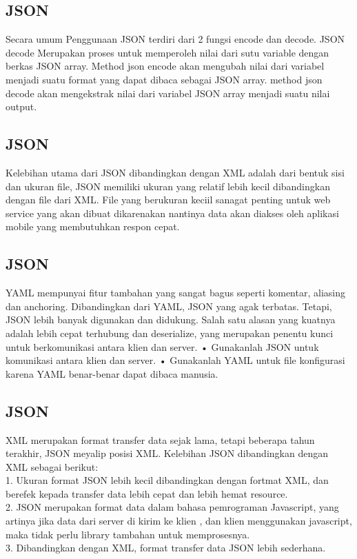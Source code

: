 \documentclass[a4paper]{article}
\begin{document}
\subsection{JSON}
Secara umum Penggunaan JSON terdiri dari 2 fungsi encode dan decode.  JSON decode Merupakan proses untuk  memperoleh nilai dari sutu variable dengan berkas JSON array. Method json encode akan mengubah nilai dari variabel  menjadi suatu format yang dapat dibaca sebagai JSON array. method json decode  akan mengekstrak nilai dari variabel JSON array  menjadi suatu nilai output.
\subsection{JSON}
Kelebihan utama dari JSON dibandingkan dengan XML adalah dari bentuk sisi dan ukuran file, JSON memiliki ukuran yang relatif  lebih kecil dibandingkan dengan file dari XML. File yang berukuran keciil sanagat penting untuk web service yang akan dibuat dikarenakan nantinya data akan diakses oleh aplikasi mobile yang membutuhkan respon cepat.
\subsection{JSON}
YAML mempunyai fitur tambahan yang sangat bagus seperti komentar, aliasing dan anchoring.  Dibandingkan dari YAML, JSON yang agak terbatas. Tetapi, JSON lebih banyak digunakan dan didukung. Salah satu alasan yang kuatnya adalah lebih cepat terhubung dan deserialize, yang merupakan penentu kunci untuk berkomunikasi antara klien dan server.
•	Gunakanlah JSON untuk komunikasi antara klien dan server.
•	Gunakanlah YAML untuk file konfigurasi karena YAML benar-benar dapat dibaca manusia.
\subsection{JSON}
XML merupakan format transfer data sejak lama, tetapi beberapa tahun terakhir, JSON meyalip posisi XML. Kelebihan JSON dibandingkan dengan XML sebagai berikut:\\
1.	Ukuran format JSON lebih kecil dibandingkan dengan fortmat XML, dan berefek kepada transfer data lebih cepat dan lebih hemat resource.\\
2.	JSON merupakan format data dalam bahasa pemrograman Javascript, yang artinya jika data dari server di kirim ke klien , dan klien menggunakan javascript, maka tidak perlu library tambahan untuk memprosesnya.\\
3.	Dibandingkan dengan XML, format transfer data JSON lebih sederhana.
\end{document}
